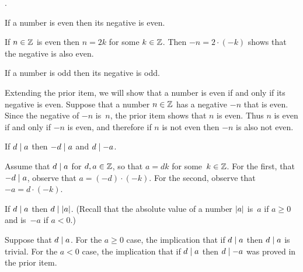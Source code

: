 \documentclass{ibl}  %
\begin{document}
\begin{problem}  
\label{ex:InteractionOfParityWithSign}
\pord.
\begin{exes}
  \begin{exercise}
    If a number is even then its negative is even.
  \end{exercise}
  \begin{answer}
    If $n\in\mathbb{Z}$ is even then $n=2k$ for some $k\in\mathbb{Z}$.
    Then $-n=2\cdot(-k)$ shows that the negative is also even.  
  \end{answer}
  \begin{exercise}[\midlength]
    If a number is odd then its negative is odd.
  \end{exercise}
  \begin{answer}
    Extending the prior item, we will show that a number is even
    if and only if its negative is even.
    Suppose that a number $n\in\mathbb{Z}$ has a negative $-n$ that is even.
    Since the negative of $-n$ is~$n$, the prior item shows that $n$ is even.
    Thus $n$ is even if and only if $-n$ is even, and therefore
    if $n$ is not even then $-n$ is also not even.
  \end{answer}
  \begin{exercise}
    If $d\mid a$ then $-d\mid a$ and $d\mid -a$.
  \end{exercise}
  \begin{answer}
    Assume that $d\mid a$ for $d,a\in\mathbb{Z}$, so that 
    $a=dk$ for some~$k\in\mathbb{Z}$.
    For the first, that $-d\mid a$, observe that
    $a=(-d)\cdot(-k)$.
    For the second, observe that $-a=d\cdot(-k)$.
  \end{answer}
  \begin{exercise}
    If $d\mid a$ then $d\mid\lvert a\rvert$.
    (Recall that the absolute value of a number $\lvert a\rvert$ is~$a$ 
    if $a\geq 0$ and is~$-a$ if $a<0$.)
  \end{exercise}
  \begin{answer}
    Suppose that $d\mid a$.
    For the $a\geq 0$ case, the implication that if $d\mid a$ then 
    $d\mid a$ is trivial.
    For the $a<0$ case, 
    the implication that if $d\mid a$ then $d\mid -a$ was
    proved in the prior item.    
  \end{answer}
\end{exes}  
\end{problem}
\end{document}
